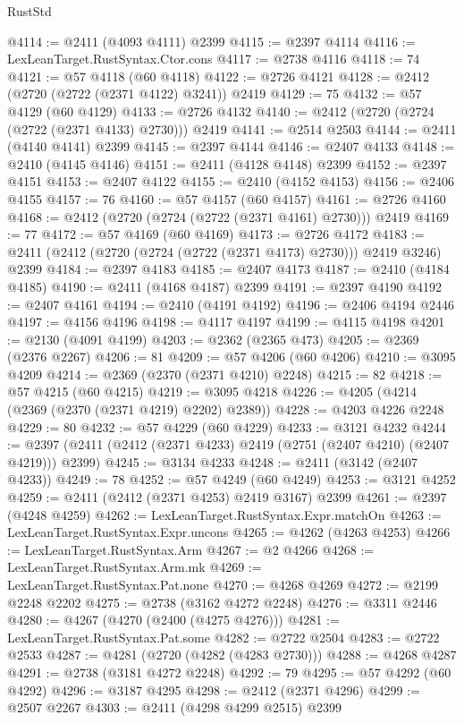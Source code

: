\begin{lexlean}{RustStd}
\begin{coremodule}
@4114 := @2411 (@4093 @4111) @2399
@4115 := @2397 @4114
@4116 := LexLeanTarget.RustSyntax.Ctor.cons
@4117 := @2738 @4116
@4118 := 74
@4121 := @57 @4118 (@60 @4118)
@4122 := @2726 @4121
@4128 := @2412 (@2720 (@2722 (@2371 @4122) @3241)) @2419
@4129 := 75
@4132 := @57 @4129 (@60 @4129)
@4133 := @2726 @4132
@4140 := @2412 (@2720 (@2724 (@2722 (@2371 @4133) @2730))) @2419
@4141 := @2514 @2503
@4144 := @2411 (@4140 @4141) @2399
@4145 := @2397 @4144
@4146 := @2407 @4133
@4148 := @2410 (@4145 @4146)
@4151 := @2411 (@4128 @4148) @2399
@4152 := @2397 @4151
@4153 := @2407 @4122
@4155 := @2410 (@4152 @4153)
@4156 := @2406 @4155
@4157 := 76
@4160 := @57 @4157 (@60 @4157)
@4161 := @2726 @4160
@4168 := @2412 (@2720 (@2724 (@2722 (@2371 @4161) @2730))) @2419
@4169 := 77
@4172 := @57 @4169 (@60 @4169)
@4173 := @2726 @4172
@4183 := @2411 (@2412 (@2720 (@2724 (@2722 (@2371 @4173) @2730))) @2419 @3246) @2399
@4184 := @2397 @4183
@4185 := @2407 @4173
@4187 := @2410 (@4184 @4185)
@4190 := @2411 (@4168 @4187) @2399
@4191 := @2397 @4190
@4192 := @2407 @4161
@4194 := @2410 (@4191 @4192)
@4196 := @2406 @4194 @2446
@4197 := @4156 @4196
@4198 := @4117 @4197
@4199 := @4115 @4198
@4201 := @2130 (@4091 @4199)
@4203 := @2362 (@2365 @473)
@4205 := @2369 (@2376 @2267)
@4206 := 81
@4209 := @57 @4206 (@60 @4206)
@4210 := @3095 @4209
@4214 := @2369 (@2370 (@2371 @4210) @2248)
@4215 := 82
@4218 := @57 @4215 (@60 @4215)
@4219 := @3095 @4218
@4226 := @4205 (@4214 (@2369 (@2370 (@2371 @4219) @2202) @2389))
@4228 := @4203 @4226 @2248
@4229 := 80
@4232 := @57 @4229 (@60 @4229)
@4233 := @3121 @4232
@4244 := @2397 (@2411 (@2412 (@2371 @4233) @2419 (@2751 (@2407 @4210) (@2407 @4219))) @2399)
@4245 := @3134 @4233
@4248 := @2411 (@3142 (@2407 @4233))
@4249 := 78
@4252 := @57 @4249 (@60 @4249)
@4253 := @3121 @4252
@4259 := @2411 (@2412 (@2371 @4253) @2419 @3167) @2399
@4261 := @2397 (@4248 @4259)
@4262 := LexLeanTarget.RustSyntax.Expr.matchOn
@4263 := LexLeanTarget.RustSyntax.Expr.uncons
@4265 := @4262 (@4263 @4253)
@4266 := LexLeanTarget.RustSyntax.Arm
@4267 := @2 @4266
@4268 := LexLeanTarget.RustSyntax.Arm.mk
@4269 := LexLeanTarget.RustSyntax.Pat.none
@4270 := @4268 @4269
@4272 := @2199 @2248 @2202
@4275 := @2738 (@3162 @4272 @2248)
@4276 := @3311 @2446
@4280 := @4267 (@4270 (@2400 (@4275 @4276)))
@4281 := LexLeanTarget.RustSyntax.Pat.some
@4282 := @2722 @2504
@4283 := @2722 @2533
@4287 := @4281 (@2720 (@4282 (@4283 @2730)))
@4288 := @4268 @4287
@4291 := @2738 (@3181 @4272 @2248)
@4292 := 79
@4295 := @57 @4292 (@60 @4292)
@4296 := @3187 @4295
@4298 := @2412 (@2371 @4296)
@4299 := @2507 @2267
@4303 := @2411 (@4298 @4299 @2515) @2399

\end{coremodule}
\end{lexlean}
